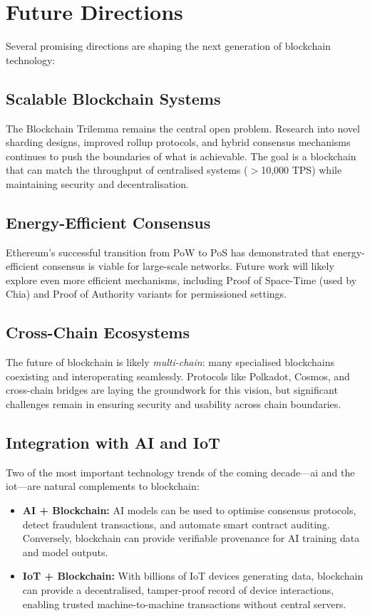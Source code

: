 \section{Future Directions}
\label{sec:future}

Several promising directions are shaping the next generation of blockchain technology:

\subsection{Scalable Blockchain Systems}

The Blockchain Trilemma remains the central open problem. Research into novel sharding designs, improved rollup protocols, and hybrid consensus mechanisms continues to push the boundaries of what is achievable. The goal is a blockchain that can match the throughput of centralised systems ($>$10{,}000 TPS) while maintaining security and decentralisation.

\subsection{Energy-Efficient Consensus}

Ethereum's successful transition from PoW to PoS has demonstrated that energy-efficient consensus is viable for large-scale networks. Future work will likely explore even more efficient mechanisms, including Proof of Space-Time (used by Chia) and Proof of Authority variants for permissioned settings.

\subsection{Cross-Chain Ecosystems}

The future of blockchain is likely \emph{multi-chain}: many specialised blockchains coexisting and interoperating seamlessly. Protocols like Polkadot, Cosmos, and cross-chain bridges are laying the groundwork for this vision, but significant challenges remain in ensuring security and usability across chain boundaries.

\subsection{Integration with AI and IoT}

Two of the most important technology trends of the coming decade---\gls{ai} and the \gls{iot}---are natural complements to blockchain:
\begin{itemize}
    \item \textbf{AI + Blockchain:} AI models can be used to optimise consensus protocols, detect fraudulent transactions, and automate smart contract auditing. Conversely, blockchain can provide verifiable provenance for AI training data and model outputs.
    \item \textbf{IoT + Blockchain:} With billions of IoT devices generating data, blockchain can provide a decentralised, tamper-proof record of device interactions, enabling trusted machine-to-machine transactions without central servers.
\end{itemize}


